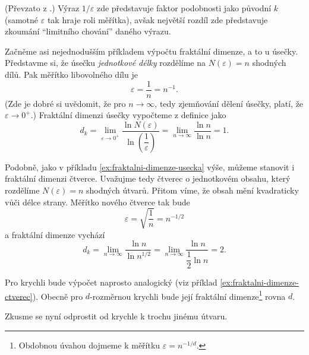 (Převzato z \cite[str. 93]{Zelinka2006}.) Výraz $1/\varepsilon$ zde představuje faktor podobnosti jako původní $k$ (samotné $\varepsilon$ tak hraje roli měřítka), avšak největší rozdíl zde představuje zkoumání ``limitního chování'' daného výrazu.
\begin{example}\label{ex:fraktalni-dimenze-usecka}
    Začněme asi nejednodušším příkladem výpočtu fraktální dimenze, a to u úsečky. Představme si, že úsečku \emph{jednotkové délky} rozdělíme na $N(\varepsilon)=n$ shodných dílů. Pak měřítko libovolného dílu je
    \[\varepsilon=\dfrac{1}{n}=n^{-1}.\]
    (Zde je dobré si uvědomit, že pro $n\to\infty$, tedy zjemňování dělení úsečky, platí, že $\varepsilon\to 0^+$.) Fraktální dimenzi úsečky vypočteme z definice jako
    \[d_k=\lim_{\varepsilon\to 0^+}{\dfrac{\ln{N(\varepsilon)}}{\ln{\left(\dfrac{1}{\varepsilon}\right)}}}=\lim_{n\to\infty}{\dfrac{\ln{n}}{\ln{n}}}=1.\]
\end{example}
\begin{example}\label{ex:fraktalni-dimenze-ctverec}
    Podobně, jako v příkladu \ref{ex:fraktalni-dimenze-usecka} výše, můžeme stanovit i fraktální dimenzi čtverce. Uvažujme tedy čtverec o jednotkovém obsahu, který rozdělíme $N(\varepsilon)=n$ shodných útvarů. Přitom víme, že obsah mění kvadraticky vůči délce strany. Měřítko nového čtverce tak bude
    \[\varepsilon=\sqrt{\dfrac{1}{n}}=n^{-1/2}\]
    a fraktální dimenze vychází
    \[d_k=\lim_{n\to\infty}{\dfrac{\ln{n}}{\ln{n^{1/2}}}}=\lim_{n\to\infty}{\dfrac{\ln{n}}{\dfrac{1}{2}\ln{n}}}=2.\]
\end{example}
Pro krychli bude výpočet naprosto analogický (viz příklad \ref{ex:fraktalni-dimenze-ctverec}). Obecně pro $d$-rozměrnou krychli bude její fraktální dimenze\footnote{Obdobnou úvahou dojmeme k měřítku $\varepsilon=n^{-1/d}$.} rovna $d$.\par
Zkusme se nyní odprostit od krychle k trochu jinému útvaru.
